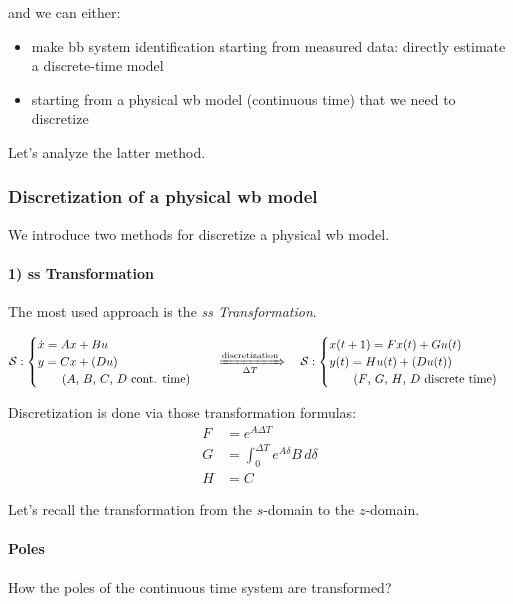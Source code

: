 \begin{appendices}
and we can either:

\begin{itemize}
    \item make \gls{bb} system identification starting from measured data: directly estimate a discrete-time model
    \item starting from a physical \gls{wb} model (continuous time) that we need to discretize 
\end{itemize}

Let's analyze the latter method.

\subsubsection*{Discretization of a physical \gls{wb} model}
We introduce two methods for discretize a physical \gls{wb} model.

\paragraph{1) \acrlong{ss} Transformation}

The most used approach is the \emph{\acrlong{ss} Transformation}.

\[
    \mathcal{S}: \begin{cases}
        \dot{x} = Ax + Bu \\
        y = Cx + (Du) \\
        \qquad \text{($A$, $B$, $C$, $D$ cont. time)}
    \end{cases}
    \quad
    \xRightarrow[\Delta T]{\text{discretization}}
    \quad
    \mathcal{S}: \begin{cases}
        x(t+1) = Fx(t) + Gu(t) \\
        y(t) = Hu(t) + (Du(t)) \\
        \qquad \text{($F$, $G$, $H$, $D$ discrete time)}
    \end{cases}
\]

Discretization is done via those transformation formulas:
\begin{align*}
    F &= e^{A\Delta T} \\
    G &= \int_0^{\Delta T} e^{A\delta}B\, d\delta \\
    H &= C 
\end{align*}

\begin{recall}[$s$-domain] Let's recall the transformation from the $s$-domain to the $z$-domain.
	
	\paragraph{Poles}
    How the poles of the continuous time system are transformed?


\end{recall}
\end{appendices}
